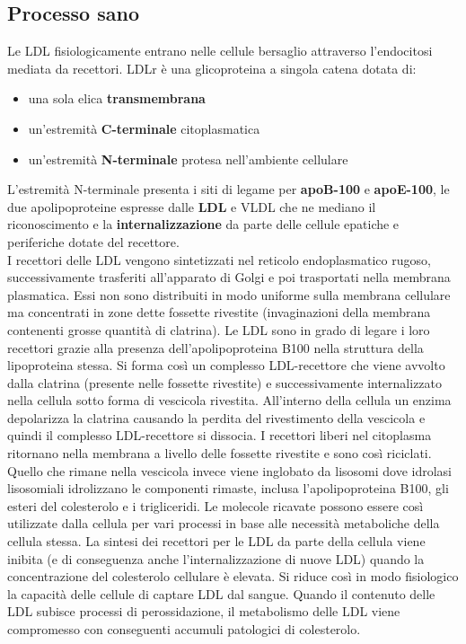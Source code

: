 \documentclass[a4paper, 12pt]{article}
\begin{document}
\begin{titlepage}
\section{Processo sano}
Le LDL fisiologicamente entrano nelle cellule bersaglio attraverso l’endocitosi mediata da recettori. LDLr è una glicoproteina a singola catena dotata di:
\begin{itemize}
  \item una sola elica \textbf{transmembrana}
  \item un'estremità \textbf{C-terminale} citoplasmatica
  \item un'estremità \textbf{N-terminale} protesa nell'ambiente cellulare
\end{itemize}
L'estremità N-terminale presenta i siti di legame per \textbf{apoB-100} e \textbf{apoE-100}, le due apolipoproteine espresse dalle \textbf{LDL} e VLDL che ne mediano il riconoscimento e la \textbf{internalizzazione} da parte delle cellule epatiche e periferiche dotate del recettore.\\
I recettori delle LDL vengono sintetizzati nel reticolo endoplasmatico rugoso, successivamente trasferiti all’apparato di Golgi e poi trasportati nella membrana plasmatica. Essi non sono distribuiti in modo uniforme sulla membrana cellulare ma concentrati in zone dette fossette rivestite (invaginazioni della membrana contenenti grosse quantità di clatrina). Le LDL sono in grado di legare i loro recettori grazie alla presenza dell’apolipoproteina B100 nella struttura della lipoproteina stessa. Si forma così un complesso LDL-recettore che viene avvolto dalla clatrina (presente nelle fossette rivestite) e successivamente internalizzato nella cellula sotto forma di vescicola rivestita. All’interno della cellula un enzima depolarizza la clatrina causando la perdita del rivestimento della vescicola e quindi il complesso LDL-recettore si dissocia. I recettori liberi nel citoplasma ritornano nella membrana a livello delle fossette rivestite e sono così riciclati. Quello che rimane nella vescicola invece viene inglobato da lisosomi dove idrolasi lisosomiali idrolizzano le componenti rimaste, inclusa l’apolipoproteina B100, gli esteri del colesterolo e i trigliceridi. Le molecole ricavate possono essere così utilizzate dalla cellula per vari processi in base alle necessità metaboliche della cellula stessa. La sintesi dei recettori per le LDL da parte della cellula viene inibita (e di conseguenza anche l’internalizzazione di nuove LDL) quando la concentrazione del colesterolo cellulare è elevata. Si riduce così in modo fisiologico la capacità delle cellule di captare LDL dal sangue. Quando il contenuto delle LDL subisce processi di perossidazione, il metabolismo delle LDL viene compromesso con conseguenti accumuli patologici di colesterolo.


\end{titlepage}
\end{document}
